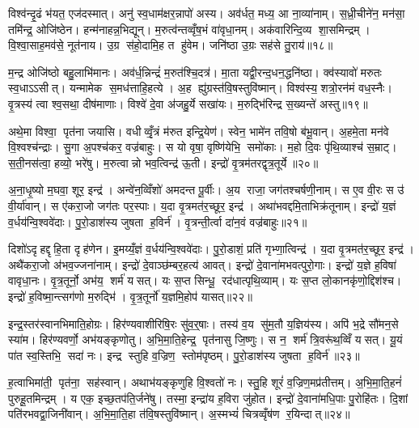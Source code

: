 विश्व॑न्दृ॒ढं भ॑यत॒ एज॑दस्मात्। अनु॑ स्व॒धाम॑क्षर॒न्नापो॑ अस्य। अव॑र्धत॒ मध्य॒ आ ना॒व्या॑नाम्। स॒ध्री॒चीने॑न॒ मन॑सा॒ तमि॑न्द्र॒ ओजि॑ष्ठेन। हन्म॑नाहन्न॒भिद्यून्। म॒रुत्व॑न्तव्वृँष॒भं वा॑वृधा॒नम्। अक॑वारिन्दि॒व्य शा॒समिन्द्रम्। वि॒श्वा॒साह॒मव॑से॒ नूत॑नाय। उ॒ग्र स॑हो॒दामि॒ह त हु॑वेम। जनि॑ष्ठा उ॒ग्रः सह॑से तु॒राय॑॥१८॥

म॒न्द्र ओजि॑ष्ठो बहु॒लाभि॑मानः। अव॑र्ध॒न्निन्द्रं॑ म॒रुत॑श्चि॒दत्र॑। मा॒ता यद्वी॒रन्द॒धन॒द्धनि॑ष्ठा। क्व॑स्यावो॑ मरुतः स्व॒धाऽऽसीत्। यन्मामेक स॒मध॑त्ताहि॒हत्ये। अ॒ह ह्यु॑ग्रस्त॑वि॒षस्तुवि॑ष्मान्। विश्व॑स्य॒ शत्रो॒रन॑मं वध॒स्नैः। वृ॒त्रस्य॑ त्वा श्व॒सथा॒ दीष॑माणाः। विश्वे॑ दे॒वा अ॑जहु॒र्ये सखा॑यः। म॒रुद्भि॑रिन्द्र स॒ख्यन्ते॑ अस्तु॥१९॥

अथे॒मा विश्वा॒ पृत॑ना जयासि। वधीव्वृँ॒त्रं म॑रुत इन्द्रि॒येण॑। स्वेन॒ भामे॑न तवि॒षो ब॑भू॒वान्। अ॒हमे॒ता मन॑वे वि॒श्वश्च॑न्द्राः। सु॒गा अ॒पश्च॑कर॒ वज्र॑बाहुः। स यो वृषा॒ वृष्णि॑येभि॒ समो॑काः। म॒हो दि॒वः पृ॑थि॒व्याश्च॑ स॒म्राट्। स॒ती॒नस॑त्वा॒ हव्यो॒ भरे॑षु। म॒रुत्वान्नो भव॒त्विन्द्र॑ ऊ॒ती। इन्द्रो॑ वृ॒त्रम॑तरद्वृत्र॒तूर्ये॥२०॥

अ॒ना॒धृ॒ष्यो म॒घवा॒ शूर॒ इन्द्र॑। अन्वे॑न॒व्विँशो॑ अमदन्त पू॒र्वीः। अ॒य राजा॒ जग॑तश्चर्\mbox{}षणी॒नाम्। स ए॒व वी॒रः स उ॑ वी॒र्या॑वान्। स ए॑करा॒जो जग॑तः पर॒स्पाः। य॒दा वृ॒त्रमत॑र॒च्छूर॒ इन्द्र॑। अथा॑भवद्दमि॒ताभिक्र॑तूनाम्। इन्द्रो॑ य॒ज्ञं व॒र्धय॑न्वि॒श्ववे॑दाः। पु॒रो॒डाश॑स्य जुषता ह॒विर्न॑। वृ॒त्रन्ती॒र्त्वा दा॑न॒वं वज्र॑बाहुः॥२१॥

दिशो॑ऽदृहद्दृहि॒ता दृह॑णेन। इ॒मय्यँ॒ज्ञं व॒र्धय॑न्वि॒श्ववे॑दाः। पु॒रो॒डाशं॒ प्रति॑ गृभ्णा॒त्विन्द्र॑। य॒दा वृ॒त्रमत॑र॒च्छूर॒ इन्द्र॑। अथै॑करा॒जो अ॑भव॒ज्जना॑नाम्। इन्द्रो॑ दे॒वाञ्छ॑म्बर॒हत्य॑ आवत्। इन्द्रो॑ दे॒वाना॑मभवत्पुरो॒गाः। इन्द्रो॑ य॒ज्ञे ह॒विषा॑ वावृधा॒नः। वृ॒त्र॒तूर्नो॒ अभ॑य॒ शर्म॑ यसत्। यः स॒प्त सिन्धू॒ रद॑धात्पृथि॒व्याम्। यः स॒प्त लो॒कानकृ॑णो॒द्दिश॑श्च। इन्द्रो॑ ह॒विष्मा॒न्त्सग॑णो म॒रुद्भि॑। वृ॒त्र॒तूर्नो॑ य॒ज्ञमि॒होप॑ यासत्॥२२॥\anuvakamend[व॒व॒र्थ॒ वि॒त्स॒ इन्द्र॑स्तु॒रायास्तु वृत्र॒तूर्ये॒ वज्र॑बाहुः पृथि॒व्यान्त्रीणि॑ च]

इन्द्र॒स्तर॑स्वानभिमाति॒होग्रः। हिर॑ण्यवाशीरिषि॒रः सु॑व॒र्॒षाः। तस्य॑ व॒य सु॑म॒तौ य॒ज्ञिय॑स्य। अपि॑ भ॒द्रे सौ॑मन॒से स्या॑म। हिर॑ण्यवर्णो॒ अभ॑यङ्कृणोतु। अ॒भि॒मा॒ति॒हेन्द्र॒ पृत॑नासु जि॒ष्णुः। स न॒ शर्म॑ त्रि॒वरू॑थ॒व्विँ यसत्। यू॒यं पा॑त स्व॒स्तिभि॒ सदा॑ नः। इन्द्र स्तुहि व॒ज्रिण॒ स्तोम॑पृष्ठम्। पु॒रो॒डाश॑स्य जुषता ह॒विर्न॑॥२३॥

ह॒त्वाभिमा॑ती॒ पृत॑ना॒ सह॑स्वान्। अथाभ॑यङ्कृणुहि वि॒श्वतो॑ नः। स्तु॒हि शूरं॑ व॒ज्रिण॒मप्र॑तीत्तम्। अ॒भि॒मा॒ति॒हनं॑ पुरुहू॒तमिन्द्रम्। य एक॒ इच्छ॒तप॑ति॒र्जने॑षु। तस्मा॒ इन्द्रा॑य ह॒विरा जु॑होत। इन्द्रो॑ दे॒वाना॑मधि॒पाः पु॒रोहि॑तः। दि॒शां पति॑रभवद्वा॒जिनी॑वान्। अ॒भि॒मा॒ति॒हा त॑वि॒षस्तुवि॑ष्मान्। अ॒स्मभ्यं॑ चित्रव्वृँष॑ण र॒यिन्दात्॥२४॥

